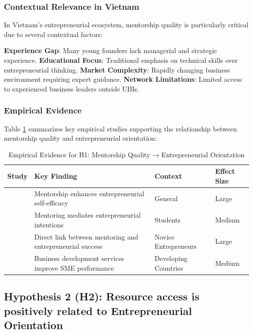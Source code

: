 \documentclass[../Main.tex]{subfiles}
\begin{document}
    \subsubsection{Contextual Relevance in Vietnam}
    In Vietnam's entrepreneurial ecosystem, mentorship quality is particularly critical due to several contextual factors:

    \textbf{Experience Gap}: Many young founders lack managerial and strategic experience. 
    \textbf{Educational Focus}: Traditional emphasis on technical skills over entrepreneurial thinking. 
    \textbf{Market Complexity}: Rapidly changing business environment requiring expert guidance. 
    \textbf{Network Limitations}: Limited access to experienced business leaders outside UBIs.

    \subsubsection{Empirical Evidence}
    Table \ref{tab:h1_evidence} summarizes key empirical studies supporting the relationship between mentorship quality and entrepreneurial orientation:

    \begin{table}[H]
        \centering
        \caption{Empirical Evidence for H1: Mentorship Quality → Entrepreneurial Orientation}
        \label{tab:h1_evidence}
        \begin{tabular}{|p{3cm}|p{4cm}|p{3cm}|p{2cm}|}
            \hline
            \textbf{Study} & \textbf{Key Finding} & \textbf{Context} & \textbf{Effect Size} \\
            \hline
            \cite{bandura1997self} & Mentorship enhances entrepreneurial self-efficacy & General & Large \\
            \hline
            \cite{zhao2005developing} & Mentoring mediates entrepreneurial intentions & Students & Medium \\
            \hline
            \cite{stjean2012mentoring} & Direct link between mentoring and entrepreneurial success & Novice Entrepreneurs & Large \\
            \hline
            \cite{sullivan2011effectiveness} & Business development services improve SME performance & Developing Countries & Medium \\
            \hline
        \end{tabular}
    \end{table}

    \subsection{Hypothesis 2 (H2): Resource access is positively related to Entrepreneurial Orientation}
\end{document}
